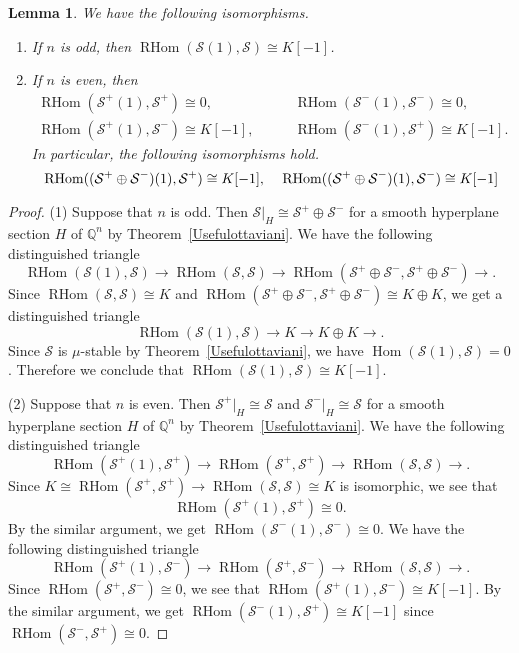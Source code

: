 \documentclass[a4paper,12pt]{amsart}
\newtheorem{lemma}[thm]{Lemma}%
\DeclareMathOperator{\Hom}{Hom}
\DeclareMathOperator{\RHom}{RHom}
\begin{document}
\begin{lemma}\label{S(1)toS}
We have the following isomorphisms.
\begin{enumerate}
\item[(1)] If $n$ is odd, then $\RHom(\mathcal{S}(1),\mathcal{S})\cong K[-1]$.
\item[(2)] If $n$ is even, then 
\begin{equation*}
\begin{split}
\RHom(\mathcal{S}^+(1),\mathcal{S}^+)\cong 0,\qquad &\RHom(\mathcal{S}^-(1),\mathcal{S}^-)\cong 0,\\
\RHom(\mathcal{S}^+(1),\mathcal{S}^-)\cong K[-1],\qquad &\RHom(\mathcal{S}^-(1),\mathcal{S}^+)\cong K[-1].
\end{split}
\end{equation*}
In particular, the following isomorphisms hold.
\[\RHom((\mathcal{S}^+\oplus\mathcal{S}^-)(1),\mathcal{S}^+)\cong K[-1],\textrm{\quad }
\RHom((\mathcal{S}^+\oplus\mathcal{S}^-)(1),\mathcal{S}^-)\cong K[-1]\]
\end{enumerate}
\end{lemma}
\begin{proof}
(1) Suppose that $n$ is odd.
Then 
$\mathcal{S}|_{H}\cong \mathcal{S}^+\oplus \mathcal{S}^-$
for a smooth hyperplane section $H$ of $\mathbb{Q}^n$
by Theorem~\ref{Usefulottaviani}.
We have the following distinguished triangle
\[
\RHom(\mathcal{S}(1),\mathcal{S})\to 
\RHom(\mathcal{S},\mathcal{S})\to
\RHom(\mathcal{S}^+\oplus \mathcal{S}^-, \mathcal{S}^+\oplus \mathcal{S}^-)
\to. 
\]
Since $\RHom(\mathcal{S},\mathcal{S})\cong K$
and $\RHom(\mathcal{S}^+\oplus \mathcal{S}^-, \mathcal{S}^+\oplus \mathcal{S}^-)\cong K\oplus K$,
we get a distinguished triangle
\[
\RHom(\mathcal{S}(1),\mathcal{S})\to 
K\to
K\oplus K
\to. 
\]
Since $\mathcal{S}$ is $\mu$-stable by Theorem~\ref{Usefulottaviani}, 
we have $\Hom(\mathcal{S}(1),\mathcal{S})=0$.
Therefore we conclude that $\RHom(\mathcal{S}(1),\mathcal{S})\cong K[-1]$.

(2) Suppose that $n$ is even.
Then $\mathcal{S}^+|_{H}\cong \mathcal{S}$
and $\mathcal{S}^-|_{H}\cong \mathcal{S}$
for a smooth hyperplane section $H$ of $\mathbb{Q}^n$
by Theorem~\ref{Usefulottaviani}.
We have the following distinguished triangle
\[
\RHom(\mathcal{S}^+(1),\mathcal{S}^+)\to 
\RHom(\mathcal{S}^+,\mathcal{S}^+)\to
\RHom(\mathcal{S}, \mathcal{S})
\to. 
\]
Since $K\cong \RHom(\mathcal{S}^+,\mathcal{S}^+)\to \RHom(\mathcal{S}, \mathcal{S})\cong K$
is isomorphic, we see that 
\[\RHom(\mathcal{S}^+(1),\mathcal{S}^+)\cong 0.\]
By the similar argument, we get $\RHom(\mathcal{S}^-(1),\mathcal{S}^-)\cong 0$.
We have the following distinguished triangle
\[
\RHom(\mathcal{S}^+(1),\mathcal{S}^-)\to 
\RHom(\mathcal{S}^+,\mathcal{S}^-)\to
\RHom(\mathcal{S}, \mathcal{S})
\to. 
\]
Since $\RHom(\mathcal{S}^+,\mathcal{S}^-)\cong 0$, we see that $\RHom(\mathcal{S}^+(1),\mathcal{S}^-)\cong K[-1]$.
By the similar argument, we get $\RHom(\mathcal{S}^-(1),\mathcal{S}^+)\cong K[-1]$
since $\RHom(\mathcal{S}^-,\mathcal{S}^+)\cong 0$.
\end{proof}
\end{document}
